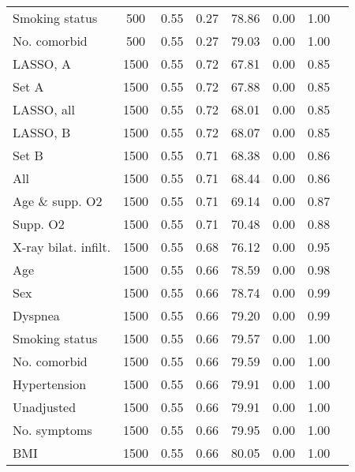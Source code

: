 \documentclass{article}
\begin{document}
{\begin{longtable}{lccccccc}
Smoking status & 500 & 0.55 & 0.27 & 78.86 & 0.00 & 1.00\\
No. comorbid & 500 & 0.55 & 0.27 & 79.03 & 0.00 & 1.00\\ \midrule
LASSO, A & 1500 & 0.55 & 0.72 & 67.81 & 0.00 & 0.85\\
Set A & 1500 & 0.55 & 0.72 & 67.88 & 0.00 & 0.85\\
LASSO, all & 1500 & 0.55 & 0.72 & 68.01 & 0.00 & 0.85\\
LASSO, B & 1500 & 0.55 & 0.72 & 68.07 & 0.00 & 0.85\\
Set B & 1500 & 0.55 & 0.71 & 68.38 & 0.00 & 0.86\\
All & 1500 & 0.55 & 0.71 & 68.44 & 0.00 & 0.86\\
Age \& supp. O2 & 1500 & 0.55 & 0.71 & 69.14 & 0.00 & 0.87\\
Supp. O2 & 1500 & 0.55 & 0.71 & 70.48 & 0.00 & 0.88\\
X-ray bilat. infilt. & 1500 & 0.55 & 0.68 & 76.12 & 0.00 & 0.95\\
Age & 1500 & 0.55 & 0.66 & 78.59 & 0.00 & 0.98\\
Sex & 1500 & 0.55 & 0.66 & 78.74 & 0.00 & 0.99\\
Dyspnea & 1500 & 0.55 & 0.66 & 79.20 & 0.00 & 0.99\\
Smoking status & 1500 & 0.55 & 0.66 & 79.57 & 0.00 & 1.00\\
No. comorbid & 1500 & 0.55 & 0.66 & 79.59 & 0.00 & 1.00\\
Hypertension & 1500 & 0.55 & 0.66 & 79.91 & 0.00 & 1.00\\
Unadjusted & 1500 & 0.55 & 0.66 & 79.91 & 0.00 & 1.00\\
No. symptoms & 1500 & 0.55 & 0.66 & 79.95 & 0.00 & 1.00\\
BMI & 1500 & 0.55 & 0.66 & 80.05 & 0.00 & 1.00\\\bottomrule
\hline
\end{longtable}
}

\clearpage
\end{document}
